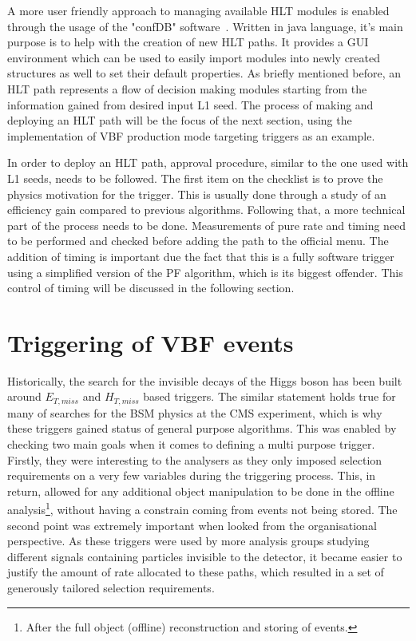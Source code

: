 \hspace{10pt} A more user friendly approach to managing available HLT modules is enabled through the usage of the "confDB" software~\cite{confdb}. Written in java language, it's main purpose is to help with the creation of new HLT paths. It provides a GUI environment which can be used to easily import modules into newly created structures as well to set their default properties. As briefly mentioned before, an HLT path represents a flow of decision making modules starting from the information gained from desired input L1 seed. The process of making and deploying an HLT path will be the focus of the next section, using the implementation of VBF production mode targeting triggers as an example.

\hspace{10pt} In order to deploy an HLT path, approval procedure, similar to the one used with L1 seeds, needs to be followed. The first item on the checklist is to prove the physics motivation for the trigger. This is usually done through a study of an efficiency gain compared to previous algorithms. Following that, a more technical part of the process needs to be done. Measurements of pure rate and timing need to be performed and checked before adding the path to the official menu. The addition of timing is important due the fact that this is a fully software trigger using a simplified version of the PF algorithm, which is its biggest offender. This control of timing will be discussed in the following section.

\newpage
\section{Triggering of VBF events}
\label{sec:vbf_trgger}
\hspace{10pt}Historically, the search for the invisible decays of the Higgs boson has been built around $E_{T,miss}$ and $H_{T,miss}$ based triggers. The similar statement holds true for many of searches for the BSM physics at the CMS experiment, which is why these triggers gained status of general purpose algorithms. This was enabled by checking two main goals when it comes to defining a multi purpose trigger. Firstly, they were interesting to the analysers as they only imposed selection requirements on a very few variables during the triggering process. This, in return, allowed for any additional object manipulation to be done in the offline analysis\footnote{After the full object (offline) reconstruction and storing of events.}, without having a constrain coming from events not being stored. The second point was extremely important when looked from the organisational perspective. As these triggers were used by more analysis groups studying different signals containing particles invisible to the detector, it became easier to justify the amount of rate allocated to these paths, which resulted in a set of generously tailored selection requirements.

